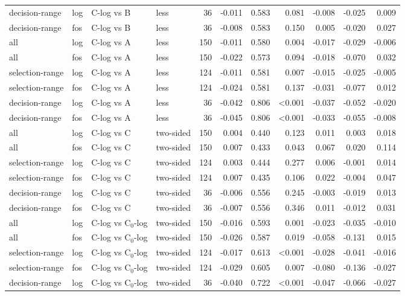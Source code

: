 \begin{longtable}{llllrrrrrrr}
decision-range & log & C-log vs B & less & 36 & -0.011 & 0.583 & 0.081 & -0.008 & -0.025 & 0.009 \\
decision-range & fos & C-log vs B & less & 36 & -0.008 & 0.583 & 0.150 & 0.005 & -0.020 & 0.027 \\
all & log & C-log vs A & less & 150 & -0.011 & 0.580 & 0.004 & -0.017 & -0.029 & -0.006 \\
all & fos & C-log vs A & less & 150 & -0.022 & 0.573 & 0.094 & -0.018 & -0.070 & 0.032 \\
selection-range & log & C-log vs A & less & 124 & -0.011 & 0.581 & 0.007 & -0.015 & -0.025 & -0.005 \\
selection-range & fos & C-log vs A & less & 124 & -0.024 & 0.581 & 0.137 & -0.031 & -0.077 & 0.012 \\
decision-range & log & C-log vs A & less & 36 & -0.042 & 0.806 & <0.001 & -0.037 & -0.052 & -0.020 \\
decision-range & fos & C-log vs A & less & 36 & -0.045 & 0.806 & <0.001 & -0.033 & -0.055 & -0.008 \\
all & log & C-log vs C & two-sided & 150 & 0.004 & 0.440 & 0.123 & 0.011 & 0.003 & 0.018 \\
all & fos & C-log vs C & two-sided & 150 & 0.007 & 0.433 & 0.043 & 0.067 & 0.020 & 0.114 \\
selection-range & log & C-log vs C & two-sided & 124 & 0.003 & 0.444 & 0.277 & 0.006 & -0.001 & 0.014 \\
selection-range & fos & C-log vs C & two-sided & 124 & 0.007 & 0.435 & 0.106 & 0.022 & -0.004 & 0.047 \\
decision-range & log & C-log vs C & two-sided & 36 & -0.006 & 0.556 & 0.245 & -0.003 & -0.019 & 0.013 \\
decision-range & fos & C-log vs C & two-sided & 36 & -0.007 & 0.556 & 0.346 & 0.011 & -0.012 & 0.031 \\
all & log & C-log vs C$_0$-log & two-sided & 150 & -0.016 & 0.593 & 0.001 & -0.023 & -0.035 & -0.010 \\
all & fos & C-log vs C$_0$-log & two-sided & 150 & -0.026 & 0.587 & 0.019 & -0.058 & -0.131 & 0.015 \\
selection-range & log & C-log vs C$_0$-log & two-sided & 124 & -0.017 & 0.613 & <0.001 & -0.028 & -0.041 & -0.016 \\
selection-range & fos & C-log vs C$_0$-log & two-sided & 124 & -0.029 & 0.605 & 0.007 & -0.080 & -0.136 & -0.027 \\
decision-range & log & C-log vs C$_0$-log & two-sided & 36 & -0.040 & 0.722 & <0.001 & -0.047 & -0.066 & -0.027 \\

\end{longtable}

